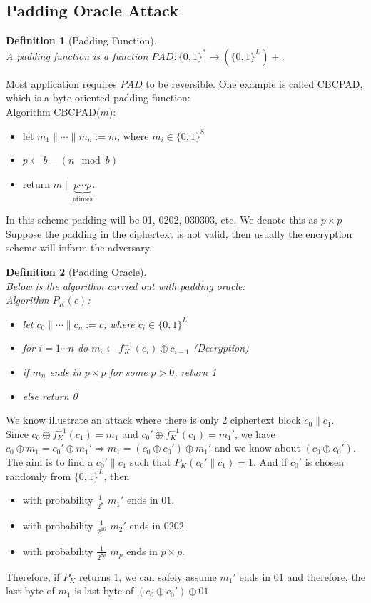 \documentclass[12pt]{article}
\newtheorem{definition}{Definition}[section]
\theoremstyle{definition}
\begin{document}
\subsection{Padding Oracle Attack}
\begin{definition}[Padding Function]
\hfill\\\normalfont A padding function is a function $PAD:\{0,1\}^\ast \to (\{0,1\}^L)+$.
\end{definition}
Most application requires $PAD$ to be reversible. One example is called CBCPAD, which is a byte-oriented padding function:\\
Algorithm CBCPAD($m$):
\begin{itemize}
\item[] let $m_1\|\cdots\|m_n:=m$, where $m_i\in\{0,1\}^8$ 
\item[] $p\leftarrow b-(n\mod b)$
\item[] return $m\| \underbrace{p\cdots p}_{p \text{times}}$.
\end{itemize}
In this scheme padding will be 01, 0202, 030303, etc. We denote this as $p\times p$\\

Suppose the padding in the ciphertext is not valid, then usually the encryption scheme will inform the adversary.
\begin{definition}[Padding Oracle]
\hfill\\\normalfont Below is the algorithm carried out with padding oracle:\\
Algorithm $P_K(c)$:
\begin{itemize}
  \item[] let $c_0\|\cdots\|c_n:=c$, where $c_i\in\{0,1\}^L$
  \item[] for $i=1\cdots n$ do $m_i\leftarrow f_K^{-1}(c_i)\oplus c_{i-1}$ (Decryption)
  \item[] if $m_n$ ends in $p\times p$ for some $p>0$, return 1
  \item[] else return 0
\end{itemize}
\end{definition}
We know illustrate an attack where there is only 2 ciphertext block $c_0\|c_1$.\\
Since $c_0\oplus f_K^{-1}(c_1)=m_1$ and $c_0'\oplus f_K^{-1}(c_1)=m_1'$, we have
$
c_0\oplus m_1 = c_0'\oplus m_1'\Rightarrow m_1=(c_0\oplus c_0')\oplus m_1'
$
and we know about $(c_0\oplus c_0')$. \\
The aim is to find a $c_0'\|c_1$ such that $P_K(c_0'\|c_1)=1$. And if $c_0'$ is chosen randomly from $\{0,1\}^L$, then
\begin{itemize}
  \item with probability $\frac{1}{2^8}$ $m_1'$ ends in $01$.
  \item with probability $\frac{1}{2^{16}}$ $m_2'$ ends in $0202$.
  \item with probability $\frac{1}{2^{8p}}$ $m_p$ ends in $p\times p$.
\end{itemize}
Therefore, if $P_K$ returns 1, we can safely assume $m_1'$ ends in $01$ and therefore, the last byte of $m_1$ is last byte of $(c_0\oplus c_0')\oplus 01$.\\
\end{document}
